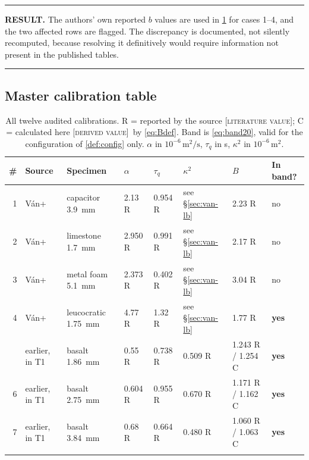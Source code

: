 \documentclass[11pt,a4paper]{article}
\theoremstyle{definition}
\newenvironment{resultbox}%
  {\par\medskip\noindent\begin{minipage}{\linewidth}%
   \rule{\linewidth}{1.0pt}\par\noindent\textbf{RESULT.}\enspace}%
  {\par\rule{\linewidth}{1.0pt}\end{minipage}\par\medskip}
\newcommand{\LIT}{\textcolor{blue!55!black}{\footnotesize[\textsc{literature value}]}}
\newcommand{\DER}{\textcolor{green!35!black}{\footnotesize[\textsc{derived value}]}}
\newcommand{\tq}{\tau_{q}}
\newcommand{\kk}{\kappa^{2}}
\newcommand{\Bnum}{B}
\begin{document}
\begin{resultbox}
The authors' own reported $b$ values are used in \cref{tab:calibrations} for
cases 1--4, and the two affected rows are flagged. The discrepancy is
documented, not silently recomputed, because resolving it definitively would
require information not present in the published tables.
\end{resultbox}

\subsection{Master calibration table}

\begin{table}[H]
\centering
\caption{All twelve audited calibrations. R = reported by the source \LIT;
         C = calculated here \DER\ by \eqref{eq:Bdef}. Band is
         \eqref{eq:band20}, valid for the configuration of \cref{def:config}
         only. $\alpha$ in $10^{-6}\,\si{\metre\squared\per\second}$, $\tq$ in
         \si{\second}, $\kk$ in $10^{-6}\,\si{\metre\squared}$.}
\label{tab:calibrations}
\scriptsize
\begin{tabular}{@{}rlllllll@{}}
\toprule
\# & Source & Specimen & $\alpha$ & $\tq$ & $\kk$ & $\Bnum$ & In band? \\
\midrule
1 & V\'an+ \cite{Van2017} & capacitor \SI{3.9}{\milli\metre}
  & 2.13 R & 0.954 R & see \S\ref{sec:van-lb} & 2.23 R & no \\
2 & V\'an+ \cite{Van2017} & limestone \SI{1.7}{\milli\metre}
  & 2.950 R & 0.991 R & see \S\ref{sec:van-lb} & 2.17 R & no \\
3 & V\'an+ \cite{Van2017} & metal foam \SI{5.1}{\milli\metre}
  & 2.373 R & 0.402 R & see \S\ref{sec:van-lb} & 3.04 R & no \\
4 & V\'an+ \cite{Van2017} & leucocratic \SI{1.75}{\milli\metre}
  & 4.77 R & 1.32 R & see \S\ref{sec:van-lb} & 1.77 R & \textbf{yes} \\
\addlinespace
5 & earlier, in \cite{FeherKovacs2021} T1
  & basalt \SI{1.86}{\milli\metre}
  & 0.55 R & 0.738 R & 0.509 R & 1.243 R / 1.254 C & \textbf{yes} \\
6 & earlier, in \cite{FeherKovacs2021} T1
  & basalt \SI{2.75}{\milli\metre}
  & 0.604 R & 0.955 R & 0.670 R & 1.171 R / 1.162 C & \textbf{yes} \\
7 & earlier, in \cite{FeherKovacs2021} T1
  & basalt \SI{3.84}{\milli\metre}
  & 0.68 R & 0.664 R & 0.480 R & 1.060 R / 1.063 C & \textbf{yes} \\
\addlinespace

\end{tabular}
\end{table}
\end{document}
